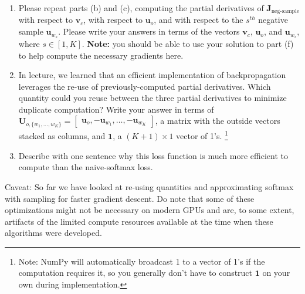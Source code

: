 \documentclass{article}
\begin{document}
\begin{enumerate}[label=(\alph*)]
\begin{enumerate}[label=(\roman*)]
\item Please repeat parts (b) and (c), computing the partial derivatives of $\bm J_{\text{neg-sample}}$ with respect to $\bm v_c$, with respect to $\bm u_o$, and with respect to the $s^{th}$ negative sample $\bm u_{w_s}$. Please write your answers in terms of the vectors $\bm v_c$, $\bm u_o$, and $\bm u_{w_s}$, where $s \in [1, K]$. \textbf{Note:} you should be able to use your solution to part (f) to help compute the necessary gradients here.

\item In lecture, we learned that an efficient implementation of backpropagation leverages the re-use of previously-computed partial derivatives. Which quantity could you reuse between the three partial derivatives to minimize duplicate computation? Write your answer in terms of \\ $\bm{U}_{o, \{w_1, \dots, w_K\}} = \begin{bmatrix} \bm{u}_o, -\bm{u}_{w_1}, \dots, -\bm{u}_{w_K} \end{bmatrix}$, a matrix with the outside vectors stacked as columns, and $\bm{1}$, a $(K + 1) \times 1$ vector of 1's. \footnote{Note: NumPy will automatically broadcast 1 to a vector of 1's if the computation requires it, so you generally don't have to construct $\bm{1}$ on your own during implementation.}

\item Describe with one sentence why this loss function is much more efficient to compute than the naive-softmax loss.
\end{enumerate}

Caveat: So far we have looked at re-using quantities and approximating softmax with sampling for faster gradient descent. Do note that some of these optimizations might not be necessary on modern GPUs and are, to some extent, artifacts of the limited compute resources available at the time when these algorithms were developed.


\end{enumerate}
\end{document}
